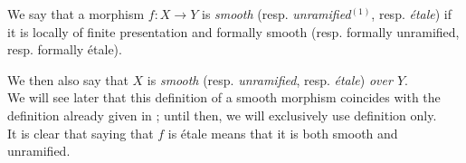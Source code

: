\begin{definition}[17.3.1]
\label{IV.17.3.1}
We say that a morphism $f : X \to Y$ is \emph{smooth} (resp. \emph{unramified}$^{(1)}$, resp. \emph{\'etale}) %
if it is locally of finite presentation and formally smooth (resp. formally unramified, resp. formally \'etale).
\end{definition}
We then also say that $X$ is \emph{smooth} (resp. \emph{unramified}, resp. \emph{\'etale}) \emph{over $Y$}.\\
We will see later  that this definition of a smooth morphism coincides with the definition already given in ; until then, we will exclusively use definition  only.\\
It is clear that saying that $f$ is \'etale means that it is both smooth and unramified.




